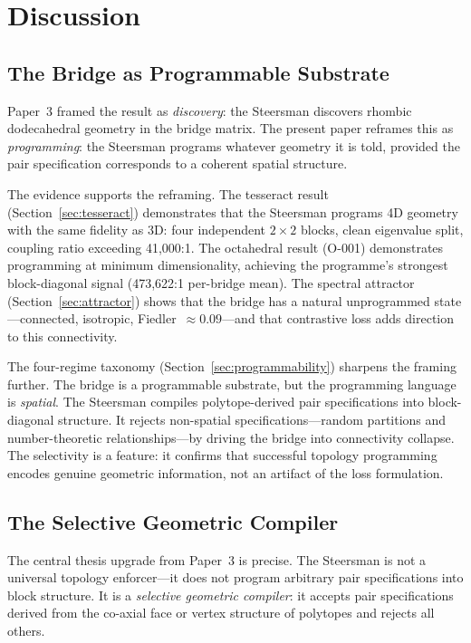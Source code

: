 \section{Discussion}
\label{sec:discussion}

\subsection{The Bridge as Programmable Substrate}

Paper~3 framed the result as \emph{discovery}: the Steersman
discovers rhombic dodecahedral geometry in the bridge matrix. The
present paper reframes this as \emph{programming}: the Steersman
programs whatever geometry it is told, provided the pair
specification corresponds to a coherent spatial structure.

The evidence supports the reframing. The tesseract result
(Section~\ref{sec:tesseract}) demonstrates that the Steersman
programs 4D geometry with the same fidelity as 3D: four independent
$2 \times 2$ blocks, clean eigenvalue split, coupling ratio
exceeding 41{,}000:1. The octahedral result (O-001) demonstrates
programming at minimum dimensionality, achieving the programme's
strongest block-diagonal signal (473{,}622:1 per-bridge mean). The
spectral attractor (Section~\ref{sec:attractor}) shows that the
bridge has a natural unprogrammed state---connected, isotropic,
Fiedler~$\approx 0.09$---and that contrastive loss adds direction
to this connectivity.

The four-regime taxonomy (Section~\ref{sec:programmability}) sharpens
the framing further. The bridge is a programmable substrate, but the
programming language is \emph{spatial}. The Steersman compiles
polytope-derived pair specifications into block-diagonal structure.
It rejects non-spatial specifications---random partitions and
number-theoretic relationships---by driving the bridge into
connectivity collapse. The selectivity is a feature: it confirms
that successful topology programming encodes genuine geometric
information, not an artifact of the loss formulation.

\subsection{The Selective Geometric Compiler}

The central thesis upgrade from Paper~3 is precise. The Steersman
is not a universal topology enforcer---it does not program arbitrary
pair specifications into block structure. It is a \emph{selective
geometric compiler}: it accepts pair specifications derived from
the co-axial face or vertex structure of polytopes and rejects
all others.

